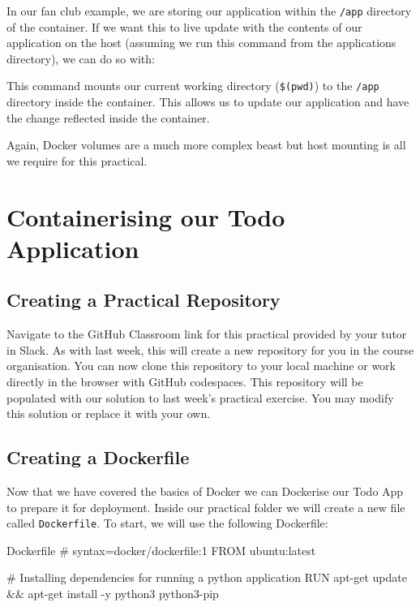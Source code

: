 \documentclass{csse4400}
\begin{document}
In our fan club example,
we are storing our application within the \texttt{/app} directory of the container.
If we want this to live update with the contents of our application on the host (assuming we run this command from the applications directory), we can do so with:

This command mounts our current working directory (\texttt{\$(pwd)}) to the \texttt{/app} directory inside the container.
This allows us to update our application and have the change reflected inside the container.

Again, Docker volumes are a much more complex beast but host mounting is all we require for this practical.

\section{Containerising our Todo Application}


\subsection{Creating a Practical Repository}
Navigate to the GitHub Classroom link for this practical provided by your tutor in Slack.
As with last week, this will create a new repository for you in the course organisation.
You can now clone this repository to your local machine or work directly in the browser with GitHub codespaces.
This repository will be populated with our solution to last week's practical exercise.
You may modify this solution or replace it with your own.

\subsection{Creating a Dockerfile}

Now that we have covered the basics of Docker we can Dockerise our Todo App to prepare it for deployment.
Inside our practical folder we will create a new file called \texttt{Dockerfile}.
To start, we will use the following Dockerfile:

\begin{code}[language=docker,numbers=none]{Dockerfile}
# syntax=docker/dockerfile:1
FROM ubuntu:latest

# Installing dependencies for running a python application
RUN apt-get update && apt-get install -y python3 python3-pip
\end{code}
\end{document}
